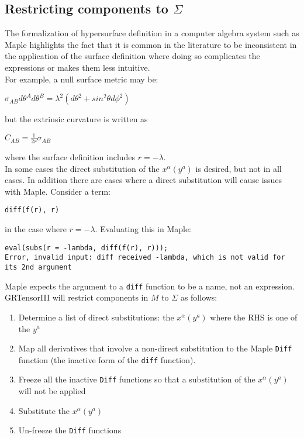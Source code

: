 \documentclass{article}
\begin{document}
\FloatBarrier
\subsection{Restricting components to $\Sigma$}
The formalization of hypersurface definition in a computer algebra system such as Maple highlights the
fact that it is common in the literature to be inconsistent in the application of the surface definition where
doing so complicates the expressions or makes them less intuitive. \\

For example, a null surface metric may be:
\begin{center}
$\sigma_{AB} d\theta^A d\theta^B = \lambda^2 \left(d\theta^2 + sin^2 \theta d\phi^2 \right)$
\end{center}
but the extrinsic curvature is written as 
\begin{center}
$C_{AB} = \frac{1}{2r} \sigma_{AB}$
\end{center}
where the surface definition includes $r=-\lambda$. \\

In some cases the direct substitution of the $x^\alpha(y^a)$ is desired, but not in all cases. In addition there are cases where
a direct substitution will cause issues with Maple. Consider a term:
\begin{center}
\texttt{diff(f(r), r)}
\end{center}
in the case where $r=-\lambda$. Evaluating this in Maple:
\begin{center}
\begin{verbatim}
eval(subs(r = -lambda, diff(f(r), r)));
Error, invalid input: diff received -lambda, which is not valid for its 2nd argument
\end{verbatim}
\end{center}
Maple expects the argument to a \texttt{diff} function to be a name, not an expression. \\

GRTensorIII will restrict components in $M$ to $\Sigma$ as follows:
\begin{enumerate}
\item Determine a list of direct substitutions: the $x^\alpha(y^a)$ where the RHS is one of the $y^a$
\item Map all derivatives that involve a non-direct substitution to the Maple \texttt{Diff} function (the
inactive form of the \texttt{diff} function). 
\item Freeze all the inactive \texttt{Diff} functions so that a substitution of the $x^\alpha(y^a)$ will not 
be applied
\item Substitute the $x^\alpha(y^a)$
\item Un-freeze the \texttt{Diff} functions
\end{enumerate}
\end{document}
